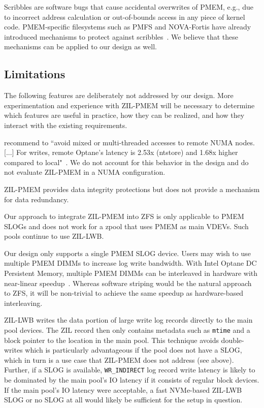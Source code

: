 \documentclass[12pt,a4paper,twoside]{book}
\begin{document}
Scribbles are software bugs that cause accidental overwrites of PMEM, e.g., due to incorrect address calculation or out-of-bounds access in any piece of kernel code.
PMEM-specific filesystems such as PMFS and NOVA-Fortis have already introduced mechanisms to protect against scribbles~\cite{dulloorSystemSoftwarePersistent2014,xuNOVAFortisFaulttolerantNonvolatile2017}.
We believe that these mechanisms can be applied to our design as well.

\subsection{Limitations}
The following features are deliberately not addressed by our design.
More experimentation and experience with ZIL-PMEM will be necessary to determine which features are useful in practice, how they can be realized, and how they interact with the existing requirements.

\citeauthor{yangEmpiricalGuideBehavior2020} recommend to ``avoid mixed or multi-threaded accesses to remote NUMA nodes. [...]  For writes, remote Optane’s latency is 2.53x (ntstore) and 1.68x higher compared to local"~\cite{yangEmpiricalGuideBehavior2020}.
We do not account for this behavior in the design and do not evaluate ZIL-PMEM in a NUMA configuration.

ZIL-PMEM provides data integrity protections but does not provide a mechanism for data redundancy.

Our approach to integrate ZIL-PMEM into ZFS is only applicable to PMEM SLOGs and does not work for a zpool that uses PMEM as main VDEVs.
Such pools continue to use ZIL-LWB.

Our design only supports a single PMEM SLOG device.
Users may wish to use multiple PMEM DIMMs to increase log write bandwidth.
With Intel Optane DC Persistent Memory, multiple PMEM DIMMs can be interleaved in hardware with near-linear speedup~\cite{yangEmpiricalGuideBehavior2020}.
Whereas software striping would be the natural approach to ZFS, it will be non-trivial to achieve the same speedup as hardware-based interleaving.

ZIL-LWB writes the data portion of large write log records directly to the main pool devices.
The ZIL record then only contains metadata such as \lstinline{mtime} and a block pointer to the location in the main pool.
This technique avoids double-writes which is particularly advantageous if the pool does not have a SLOG, which in turn is a use case that ZIL-PMEM does not address (see above).
Further, if a SLOG is available, \lstinline{WR_INDIRECT} log record write latency is likely to be dominated by the main pool's IO latency if it consists of regular block devices.
If the main pool's IO latency were acceptable, a fast NVMe-based ZIL-LWB SLOG or no SLOG at all would likely be sufficient for the setup in question.
\end{document}
